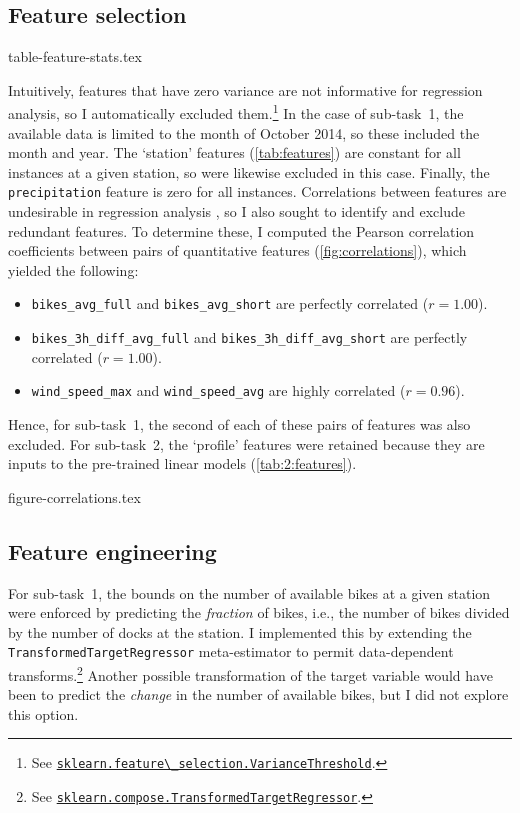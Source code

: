 \documentclass[11pt]{extarticle}
\newcommand{\windspeedmax}{\texttt{wind\_speed\_max}}
\newcommand{\windspeedavg}{\texttt{wind\_speed\_avg}}
\newcommand{\bikesavgfull}{\texttt{bikes\_avg\_full}}
\newcommand{\bikesavgshort}{\texttt{bikes\_avg\_short}}
\newcommand{\bikeshdiffavgfull}{\texttt{bikes\_3h\_diff\_avg\_full}}
\newcommand{\bikeshdiffavgshort}{\texttt{bikes\_3h\_diff\_avg\_short}}
\newcommand{\sklearn}[2]{\href{https://scikit-learn.org/stable/modules/generated/sklearn.#1.#2.html}{\lstinline|sklearn.#1.#2|}}
\begin{document}
\subsection{Feature selection}
\label{sec:feature-selection}

{table-feature-stats.tex}

Intuitively, features that have zero variance are not informative for regression
analysis, so I automatically excluded them.\footnote{See
  \sklearn{feature\_selection}{VarianceThreshold}.
}
In the case of sub-task~1, the available data is limited to the month of October 2014,
so these included the month and year.
The `station' features (\cref{tab:features}) are constant for all instances at a given
station, so were likewise excluded in this case.
Finally, the \texttt{precipitation} feature is zero for all instances.
Correlations between features are undesirable in regression analysis
\parencite{Alin2010}, so I also sought to identify and exclude redundant features.
To determine these, I computed the Pearson correlation coefficients between pairs of
quantitative features (\cref{fig:correlations}), which yielded the following:
\begin{itemize}
  \item \texttt{\bikesavgfull} and \texttt{\bikesavgshort} are perfectly correlated ($r = 1.00$).
  \item \texttt{\bikeshdiffavgfull} and \texttt{\bikeshdiffavgshort} are perfectly correlated ($r  = 1.00$).
  \item \texttt{\windspeedmax} and \texttt{\windspeedavg} are highly correlated ($r = 0.96$).
\end{itemize}
Hence, for sub-task~1, the second of each of these pairs of features was also excluded.
For sub-task~2, the `profile' features were retained because they are inputs to the
pre-trained linear models (\cref{tab:2:features}).

{figure-correlations.tex}

\subsection{Feature engineering}
\label{sec:feature-engineering}

For sub-task~1, the bounds on the number of available bikes at a given station were
enforced by predicting the \emph{fraction} of bikes, i.e., the number of bikes divided
by the number of docks at the station.
I implemented this by extending the \texttt{TransformedTargetRegressor} meta-estimator
to permit data-dependent transforms.\footnote{See
  \sklearn{compose}{TransformedTargetRegressor}.
}
Another possible transformation of the target variable would have been to predict the
\emph{change} in the number of available bikes, but I did not explore this option.
\end{document}
